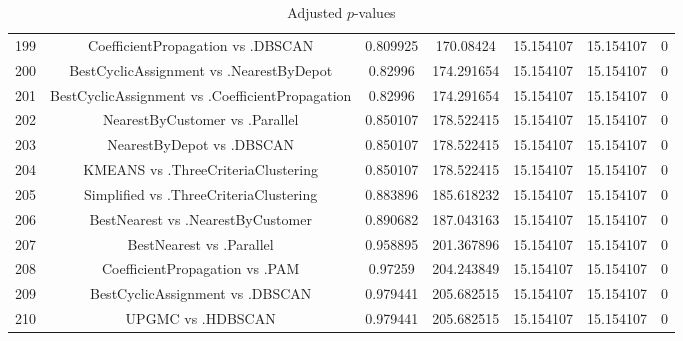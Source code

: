 \documentclass[a4paper,10pt]{article}
\begin{document}
\begin{landscape}
\begin{table}[!htp]
\begin{tabular}{ccccccc}
199&CoefficientPropagation vs .DBSCAN&0.809925&170.08424&15.154107&15.154107&0\\
200&BestCyclicAssignment vs .NearestByDepot&0.82996&174.291654&15.154107&15.154107&0\\
201&BestCyclicAssignment vs .CoefficientPropagation&0.82996&174.291654&15.154107&15.154107&0\\
202&NearestByCustomer vs .Parallel&0.850107&178.522415&15.154107&15.154107&0\\
203&NearestByDepot vs .DBSCAN&0.850107&178.522415&15.154107&15.154107&0\\
204&KMEANS vs .ThreeCriteriaClustering&0.850107&178.522415&15.154107&15.154107&0\\
205&Simplified vs .ThreeCriteriaClustering&0.883896&185.618232&15.154107&15.154107&0\\
206&BestNearest vs .NearestByCustomer&0.890682&187.043163&15.154107&15.154107&0\\
207&BestNearest vs .Parallel&0.958895&201.367896&15.154107&15.154107&0\\
208&CoefficientPropagation vs .PAM&0.97259&204.243849&15.154107&15.154107&0\\
209&BestCyclicAssignment vs .DBSCAN&0.979441&205.682515&15.154107&15.154107&0\\
210&UPGMC vs .HDBSCAN&0.979441&205.682515&15.154107&15.154107&0\\
\hline
\end{tabular}
\caption{Adjusted $p$-values}
\end{table}

\end{landscape}
\end{document}
